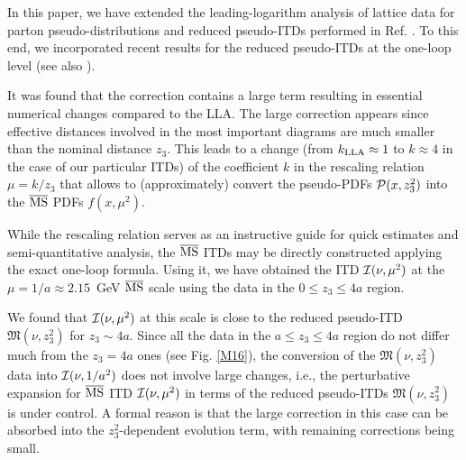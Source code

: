 \documentclass[aps,prd,twocolumn,showpacs,preprintnumbers,superscriptaddress]{revtex4-1}
\begin{document}
   In this paper, we  have extended   the leading-logarithm 
   analysis of lattice data for  parton pseudo-distributions 
   and reduced pseudo-ITDs 
   performed in Ref. \cite{Orginos:2017kos}. 
   To this end, we incorporated 
    recent  results for the reduced pseudo-ITDs at   the one-loop level   \cite{Radyushkin:2017lvu} 
   (see also \cite{Ji:2017rah,Izubuchi:2018srq}).
      
    

      
    It was  found that the correction contains a  large term
    resulting  in essential numerical  changes  compared to  the LLA.
    The   large correction appears since  
    effective distances involved in the most important diagrams
    are much smaller than the nominal distance $z_3$. 
    This  leads to a  change
    (from $k_{\rm LLA} \approx 1$ to $k \approx 4$  in the case of our
    particular ITDs)  of the 
    coefficient $k$ in  the 
    rescaling relation $\mu = k/z_3$  that allows to (approximately) 
    convert  the pseudo-PDFs ${\cal P} (x,z_3^2)$ into the $\overline{\rm MS}$
    PDFs $f(x,\mu^2)$.   
    
    
    
    

    
 While the  rescaling relation serves as an  
instructive guide for quick estimates and  semi-quantitative analysis,
 the $\overline{\rm MS}$ ITDs may be directly constructed applying   the 
 exact one-loop formula.  Using it, we have obtained 
  the 
    ITD ${\cal I} (\nu, \mu^2)$ at the \mbox{$\mu=1/a \approx 2.15$ GeV}  
    $\overline{\rm MS}$ scale
          using the data in the  \mbox{$0\leq z_3 \leq 4a$}   region. 
          
         We  found that ${\cal I} (\nu, \mu^2)$ at this scale is  close
          to the reduced pseudo-ITD ${\mathfrak M} (\nu,z_3^2)$  for $z_3\sim 4a$.
          Since  all the data in the $a\leq z_3 \leq 4a$ region do not differ much from 
          the $z_3=4a$ ones (see Fig. \ref{M16}), the conversion of 
          the ${\mathfrak M} (\nu,z_3^2)$ data into ${\cal I} (\nu, 1/a^2)$
          does not involve large changes, i.e., 
  the perturbative expansion for   $\overline{\rm MS}$  ITD ${\cal I} (\nu, \mu^2)$
  in terms of the reduced 
    pseudo-ITDs ${\mathfrak M} (\nu,z_3^2)$    is  under control.  
 A  formal reason is that the   large  correction in this  case can  be 
    absorbed into the $z_3^2$-dependent evolution term, 
    with remaining corrections being small.  
         
\end{document}

